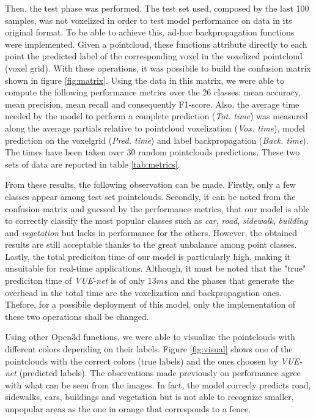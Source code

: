 Then, the test phase was performed. The test set used, composed by the last 100 samples, 
was not voxelized in order to test model performance on data in its original format.
To be able to achieve this, ad-hoc backpropagation functions were implemented.
Given a pointcloud, these functions attribute directly to each point the predicted label of the
corresponding voxel in the voxelized pointcloud (voxel grid).
With these operations, it was possibile to build the confusion matrix shown in figure \ref{fig:matrix}.
Using the data in this matrix, we were able to compute the following performance metrics over the 26 classes: 
mean accuracy, mean precision, mean recall and consequently F1-score.
Also, the average time needed by the model to perform a complete prediction (\textit{Tot. time}) was measured along the average partials relative to
pointcloud voxelization (\textit{Vox. time}), model prediction on the voxelgrid (\textit{Pred. time}) and
label backpropagation (\textit{Back. time}). The times have been taken over 30 random pointclouds predictions.
These two sets of data are reported in table \ref{tab:metrics}.

From these results, the following observation can be made.
Firstly, only a few classes appear among test set pointclouds.
Secondly, it can be noted from the confusion matrix and guessed by the performance metrics, 
that our model is able to correctly classify the most popular classes such as \textit{car},
\textit{road}, \textit{sidewalk}, \textit{building} and \textit{vegetation} 
but lacks in performance for the others. 
However, the obtained results are still acceptable thanks to the great unbalance among point classes.
Lastly, the total prediciton time of our model is particularly high,
making it unsuitable for real-time applications. Although, it must be noted that the "true" prediciton time
of \textit{VUE-net} is of only $13ms$ and the phases that generate the overhead in the total time
are the voxelization and backpropagation ones. Thefore, for a possibile deployment of this model, only the 
implementation of these two operations shall be changed.

Using other Open3d functions, we were able to visualize the pointclouds with different colors depending
on their labels. Figure \ref{fig:visual} shows one of the pointclouds with the
correct colors (true labels) and the ones choosen by \textit{VUE-net} (predicted labels).
The observations made previously on performance agree with what can be seen from the images.
In fact, the model correcly predicts road, sidewalks, cars, buildings and vegetation but is not
able to recognize smaller, unpopular areas as the one in orange that corresponds to a fence.